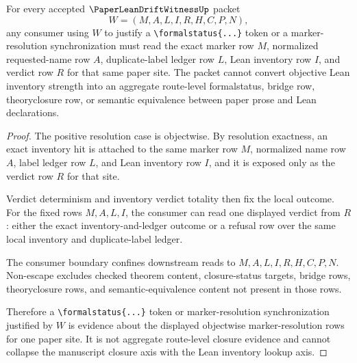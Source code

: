 \begin{theorem}
\label{thm:paper-lean-drift-witness-token-objectwise-audit}
For every accepted $\PaperLeanDriftWitnessUp$ packet
$$
W=(M,A,L,I,R,H,C,P,N),
$$
any consumer using $W$ to justify a \texttt{\textbackslash formalstatus\{...\}} token or a marker-resolution synchronization must read the exact marker row $M$, normalized requested-name row $A$, duplicate-label ledger row $L$, Lean inventory row $I$, and verdict row $R$ for that same paper site. The packet cannot convert objective Lean inventory strength into an aggregate route-level formalstatus, bridge row, theoryclosure row, or semantic equivalence between paper prose and Lean declarations.
\end{theorem}
\begin{proof}
The positive resolution case is objectwise. By resolution exactness, an exact inventory hit is attached to the same marker row $M$, normalized name row $A$, label ledger row $L$, and Lean inventory row $I$, and it is exposed only as the verdict row $R$ for that site.

Verdict determinism and inventory verdict totality then fix the local outcome. For the fixed rows $M,A,L,I$, the consumer can read one displayed verdict from $R$: either the exact inventory-and-ledger outcome or a refusal row over the same local inventory and duplicate-label ledger.

The consumer boundary confines downstream reads to $M,A,L,I,R,H,C,P,N$. Non-escape excludes checked theorem content, closure-status targets, bridge rows, theoryclosure rows, and semantic-equivalence content not present in those rows.

Therefore a \texttt{\textbackslash formalstatus\{...\}} token or marker-resolution synchronization justified by $W$ is evidence about the displayed objectwise marker-resolution rows for one paper site. It is not aggregate route-level closure evidence and cannot collapse the manuscript closure axis with the Lean inventory lookup axis.
\end{proof}

